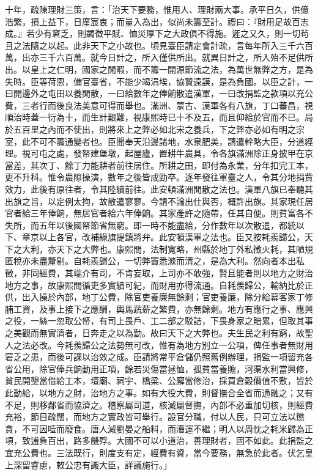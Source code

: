 \begin{pinyinscope}
十年，疏陳理財三策，言：「治天下要務，惟用人、理財兩大事。承平日久，供億浩繁，損上益下，日廑宸衷；而量入為出，似尚未籌至計。禮曰：『財用足故百志成。』若少有窘乏，則蠲徵平賦、恤災厚下之大政俱不得施。遲之又久，則一切茍且之法隨之以起。此非天下之小故也。頃見臺臣請定會計疏，言每年所入三千六百萬，出亦三千六百萬。就今日計之，所入僅供所出。就異日計之，所入殆不足供所出。以皇上之仁明，國家之閒暇，而不籌一開源節流之法，為萬世無弊之方，是為失時。臣等荷恩，備官臺省，不能少竭涓埃，協贊遠謨，是為負國。以臣之計，一曰開邊外之屯田以養閒散，一曰給數年之俸餉散遣漢軍，一曰改捐監之款項以充公費，三者行而後良法美意可得而舉也。滿洲、蒙古、漢軍各有八旗，丁口蕃昌，視順治時蓋一衍為十，而生計艱難，視康熙時已十不及五，而且仰給於官而不已。局於五百里之內而不使出，則將來上之弊必如北宋之養兵，下之弊亦必如有明之宗室，此不可不籌通變者也。臣聞奉天沿邊諸地，水泉肥美，請遣幹略大臣，分道經理。視可屯之處，發帑建堡墩，起屋廬，置耕牛農具，令各旗滿洲除正身披甲在京當差，其次丁、餘丁力能耕者前往居住。所耕之田，即付為永業，分年扣完工本，更不升科。惟令農隙操演，數年之後皆成勁卒。逐年發往軍臺之人，令其分地捐貲效力，此後有原往者，令其陸續前往。此安頓滿洲閒散之法也。漢軍八旗已奉聽其出旗之旨，以定例太拘，故散遣寥寥。今請不論出仕與否，概許出旗。其家現任居官者給三年俸餉，無居官者給六年俸餉。其家產許之隨帶，任其自便。則貧富各不失所，而五年以後國帑節省無窮。即一時不能盡給，分作數年以次散遣，都統以下、章京以上各官，改補綠旗提鎮將弁。此安頓漢軍之法也。臣又按耗羨歸公，天下之大利，亦天下之大弊也。康熙間，法制寬略，州縣於地丁外私徵火耗，其陋規匿稅亦未盡釐剔。自耗羨歸公，一切弊竇悉滌而清之，是為大利。然向者本出私徵，非同經費，其端介有司，不肯妄取，上司亦不敢強，賢且能者則以地方之財治地方之事，故康熙間循吏多實績可紀，而財用亦得流通。自耗羨歸公，輸納比於正供，出入操於內部，地丁公費，除官吏養廉無餘剩；官吏養廉，除分給幕客家丁修脯工資，及事上接下之應酬，輿馬蔬薪之繁費，亦無餘剩。地方有應行之事、應興之役，一絲一忽取公帑，有司上畏戶、工二部之駁詰，下畏身家之賠累，但取其事之美觀而無實濟者，日奔走之以為勤。故曰天下之大弊也。夫生民之利有窮，故聖人之法必改。今耗羨歸公之法勢無可改，惟有為地方別立一公項，俾任事者無財用窘乏之患，而後可課以治效之成。臣請將常平倉儲仍照舊例辦理，捐監一項留充各省公用，除官俸兵餉動用正項，餘若災傷當拯恤，孤貧當養贍，河渠水利當興修，貧民開墾當借給工本，壇廟、祠宇、橋梁、公廨當修治，採買倉穀價值不敷，皆於此動給，以地方之財，治地方之事。如有大役大費，則督撫合全省而通融之；又有不足，則移鄰省而協濟之。稽察屬司道，核減屬督撫，內部不必重加切核，則經費充裕，節目疏闊，而地方之實政皆可舉行。設官分職，付以人民，只可立法以懲貪，不可因噎而廢食。唐人減劉晏之船料，而漕運不繼；明人以周忱之耗米歸為正項，致逋負百出，路多饑殍。大國不可以小道治，善理財者，固不如此。此捐監之宜充公費也。三法既行，則度支有定，經費有資，當今要務，無急於此者。伏乞皇上深留睿慮，敕公忠有識大臣，詳議施行。」


\end{pinyinscope}
